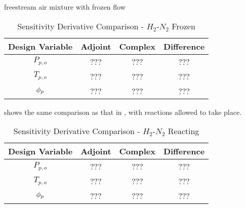freestream air mixture with frozen flow
\begin{table}[h]
  \centering
  \begin{tabular}{c|c|c|c}
    Design Variable & Adjoint & Complex & Difference\\
    \hline
    $P_{p,o}$ & ??? & ??? & ??? \\
    $T_{p,o}$ & ??? & ??? & ??? \\
    $\phi_p$     & ??? & ??? & ???
  \end{tabular}
  \caption{Sensitivity Derivative Comparison - $H_2$-$N_2$ Frozen}
  \label{tab:frozen-deriv-check}
\end{table}
 shows the same comparison as that in
, with reactions allowed to take place.
\begin{table}[h]
  \centering
  \begin{tabular}{c|c|c|c}
    Design Variable & Adjoint & Complex & Difference\\
    \hline
    $P_{p,o}$ & ??? & ??? & ??? \\
    $T_{p,o}$ & ??? & ??? & ??? \\
    $\phi_p$     & ??? & ??? & ???
  \end{tabular}
  \caption{Sensitivity Derivative Comparison - $H_2$-$N_2$ Reacting}
  \label{tab:react-deriv-check}
\end{table}
